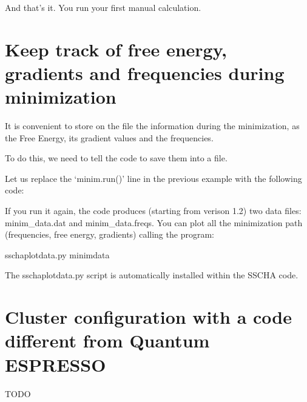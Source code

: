 \documentclass[a4paper,11pt,english]{sphinxmanual}
\begin{document}
\sphinxAtStartPar
And that’s it. You run your first manual calculation.


\section{Keep track of free energy, gradients and frequencies during minimization}
\label{\detokenize{advanced:keep-track-of-free-energy-gradients-and-frequencies-during-minimization}}
\sphinxAtStartPar
It is convenient to store on the file the information during the minimization, as the Free Energy, its gradient values and the frequencies.

\sphinxAtStartPar
To do this, we need to tell the code to save them into a file.

\sphinxAtStartPar
Let us replace the ‘minim.run()’ line in the previous example with the following code:

\begin{sphinxVerbatim}[commandchars=\\\{\}]
 
  

  
\end{sphinxVerbatim}

\sphinxAtStartPar
If you run it again, the code produces (starting from verison 1.2) two data files: minim\_data.dat and minim\_data.freqs.
You can plot all the minimization path (frequencies, free energy, gradients) calling the program:

\begin{sphinxVerbatim}[commandchars=\\\{\}]
\PYGZdl{} sscha\PYGZhy{}plot\PYGZhy{}data.py minim\PYGZus{}data
\end{sphinxVerbatim}

\sphinxAtStartPar
The sscha\sphinxhyphen{}plot\sphinxhyphen{}data.py script is automatically installed within the SSCHA code.


\section{Cluster configuration with a code different from Quantum ESPRESSO}
\label{\detokenize{advanced:cluster-configuration-with-a-code-different-from-quantum-espresso}}
\sphinxAtStartPar
TODO
\end{document}
